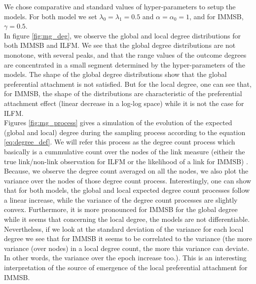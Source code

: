 We chose comparative and standard values of hyper-parameters to setup the models. For both model we set $\lambda_0=\lambda_1=0.5$ and $\alpha=\alpha_0=1$, and for IMMSB, $\gamma=0.5$.~\\

In figure \ref{fig:mg_deg}, we observe the global and local degree distributions for both IMMSB and ILFM. We see that the global degree distributions are not monotone, with several peaks, and that the range values of the outcome degrees are concentrated in a small segment determined by the hyper-parameters of the models. The shape of the global degree distributions show that the global preferential attachment is not satisfied. But for the local degree, one can see that, for IMMSB, the shape of the distributions are characteristic of the preferential attachment effect (linear decrease in a log-log space) while it is not the case for ILFM. %
~\\




Figures \ref{fig:mg_process} gives a simulation of the evolution of the expected (global and local) degree during the sampling process according to the equation \eqref{eq:degree_def}. We will refer this process as the degree count process which basically is a cummulative count over the nodes of the link measure (eitheir the true link/non-link observation for ILFM or the likelihood of a link for IMMSB) . Because, we observe the degree count averaged on all the nodes, we also plot the variance over the nodes of those degree count process.
Interestingly, one can show that for both models, the global and local expected degree count processes follow a linear increase, while the variance of the degree count processes are slightly convex. Furthermore, it is more pronounced for IMMSB for the global degree while it seems that concerning the local degree, the models are not differentiable. Nevertheless, if we look at the standard deviation of the variance for each local degree we see that for IMMSB it seems to be correlated to the variance (the more variance (over nodes) in a local degree count, the more this variance can deviate. In other words, the variance over the epoch increase too.). This is an interesting interpretation of the source of emergence of the local preferential attachment for IMMSB.




